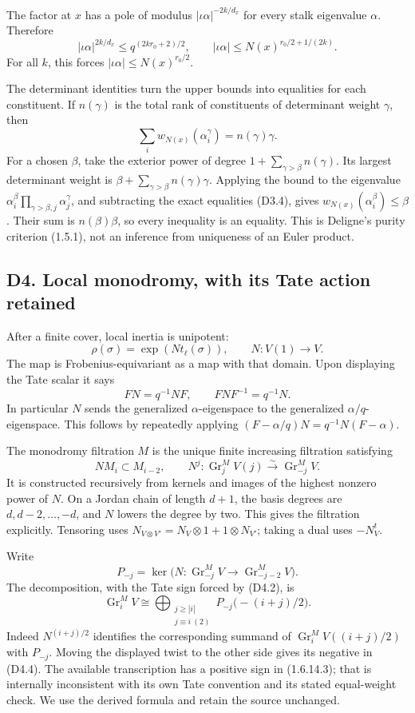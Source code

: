 The factor at \(x\) has a pole of modulus \(|\iota\alpha|^{-2k/d_x}\)
for every stalk eigenvalue \(\alpha\). Therefore \[
|\iota\alpha|^{2k/d_x}\le q^{(2kr_0+2)/2},
\qquad
|\iota\alpha|\le N(x)^{r_0/2+1/(2k)}.
\tag{D3.3}
\] For all \(k\), this forces \(|\iota\alpha|\le N(x)^{r_0/2}\).

The determinant identities turn the upper bounds into equalities for
each constituent. If \(n(\gamma)\) is the total rank of constituents of
determinant weight \(\gamma\), then \[
\sum_i w_{N(x)}(\alpha_i^\gamma)=n(\gamma)\gamma.
\tag{D3.4}
\] For a chosen \(\beta\), take the exterior power of degree
\(1+\sum_{\gamma>\beta}n(\gamma)\). Its largest determinant weight is
\(\beta+\sum_{\gamma>\beta}n(\gamma)\gamma\). Applying the bound to the
eigenvalue \(\alpha_i^\beta\prod_{\gamma>\beta,j}\alpha_j^\gamma\), and
subtracting the exact equalities (D3.4), gives
\(w_{N(x)}(\alpha_i^\beta)\le\beta\). Their sum is \(n(\beta)\beta\), so
every inequality is an equality. This is Deligne's purity criterion
(1.5.1), not an inference from uniqueness of an Euler product.

\subsection{D4. Local monodromy, with its Tate action
retained}\label{d4.-local-monodromy-with-its-tate-action-retained}

After a finite cover, local inertia is unipotent: \[
\rho(\sigma)=\exp\!\left(Nt_\ell(\sigma)\right),
\qquad N:V(1)\longrightarrow V.
\tag{D4.1}
\] The map is Frobenius-equivariant as a map with that domain. Upon
displaying the Tate scalar it says \[
FN=q^{-1}NF,\qquad FNF^{-1}=q^{-1}N.
\tag{D4.2}
\] In particular \(N\) sends the generalized \(\alpha\)-eigenspace to
the generalized \(\alpha/q\)-eigenspace. This follows by repeatedly
applying \((F-\alpha/q)N=q^{-1}N(F-\alpha)\).

The monodromy filtration \(M\) is the unique finite increasing
filtration satisfying \[
NM_i\subset M_{i-2},
\qquad
N^j:\operatorname{Gr}^M_jV(j)\xrightarrow{\sim}\operatorname{Gr}^M_{-j}V.
\tag{D4.3}
\] It is constructed recursively from kernels and images of the highest
nonzero power of \(N\). On a Jordan chain of length \(d+1\), the basis
degrees are \(d,d-2,\ldots,-d\), and \(N\) lowers the degree by two.
This gives the filtration explicitly. Tensoring uses
\(N_{V\otimes V'}=N_V\otimes1+1\otimes N_{V'}\); taking a dual uses
\(-N_V^t\).

Write \[
P_{-j}=\ker\bigl(N:\operatorname{Gr}_{-j}^MV\to
                     \operatorname{Gr}_{-j-2}^MV\bigr).
\] The decomposition, with the Tate sign forced by (D4.2), is \[
\operatorname{Gr}_i^MV
\cong
\bigoplus_{\substack{j\ge|i|\\j\equiv i\ (2)}}P_{-j}\bigl(-(i+j)/2\bigr).
\tag{D4.4}
\] Indeed \(N^{(i+j)/2}\) identifies the corresponding summand of
\(\operatorname{Gr}_i^MV((i+j)/2)\) with \(P_{-j}\). Moving the
displayed twist to the other side gives its negative in (D4.4). The
available transcription has a positive sign in (1.6.14.3); that is
internally inconsistent with its own Tate convention and its stated
equal-weight check. We use the derived formula and retain the source
unchanged.

